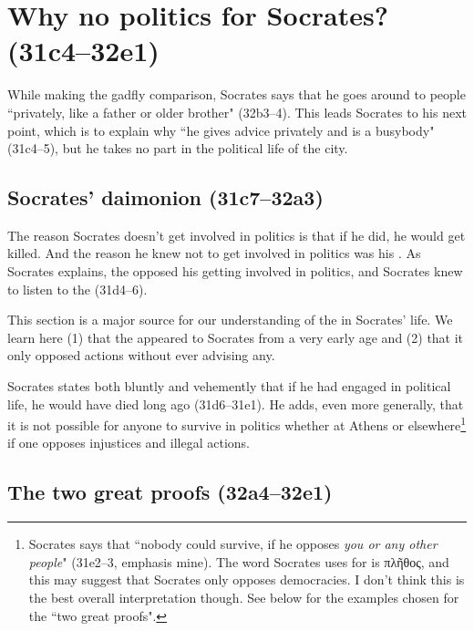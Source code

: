 \documentclass[11pt]{article}
\begin{document}
\section{Why no politics for Socrates? (31c4--32e1)}

While making the gadfly comparison, Socrates says that he goes around to people ``privately, like a father or older brother" (32b3--4).  This leads Socrates to his next point, which is to explain why ``he gives advice privately and is a busybody" (31c4--5), but he takes no part in the political life of the city.

\subsection{Socrates' daimonion (31c7--32a3)}

The reason Socrates doesn't get involved in politics is that if he did, he would get killed.  And the reason he knew not to get involved in politics was his .  As Socrates explains, the  opposed his getting involved in politics, and Socrates knew to listen to the  (31d4--6).

This section is a major source for our understanding of the  in Socrates' life.  We learn here (1) that the  appeared to Socrates from a very early age and (2) that it only opposed actions without ever advising any.

Socrates states both bluntly and vehemently that if he had engaged in political life, he would have died long ago (31d6--31e1).  He adds, even more generally, that it is not possible for anyone to survive in politics whether at Athens or elsewhere\footnote{Socrates says that ``nobody could survive, if he opposes \emph{you or any other people}" (31e2--3, emphasis mine).  The word Socrates uses for  is πλῆθος, and this may suggest that Socrates only opposes democracies.  I don't think this is the best overall interpretation though.  See below for the examples chosen for the ``two great proofs".} if one opposes injustices and illegal actions.

\subsection{The two great proofs (32a4--32e1)}
\end{document}

